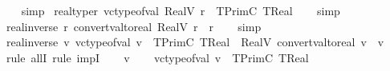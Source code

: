 \begin{isabellebody}
%
\isadelimproof
\ \ %
\endisadelimproof
%
\isatagproof
{}\isamarkupfalse%
\ simp%
\endisatagproof
{\isafoldproof}%
%
\isadelimproof
\isanewline
%
\endisadelimproof
\isanewline
{}\isamarkupfalse%
\ real{\isacharunderscore}{\kern0pt}type{\isacharcolon}{\kern0pt}{\isachardoublequoteopen}{\isasymforall}r{\isachardot}{\kern0pt}\ vc{\isacharunderscore}{\kern0pt}type{\isacharunderscore}{\kern0pt}of{\isacharunderscore}{\kern0pt}val\ {\isacharparenleft}{\kern0pt}RealV\ r{\isacharparenright}{\kern0pt}\ {\isacharequal}{\kern0pt}\ TPrimC\ TReal{\isachardoublequoteclose}\isanewline
%
\isadelimproof
\ \ %
\endisadelimproof
%
\isatagproof
{}\isamarkupfalse%
\ simp%
\endisatagproof
{\isafoldproof}%
%
\isadelimproof
\isanewline
%
\endisadelimproof
\isanewline
{}\isamarkupfalse%
\ real{\isacharunderscore}{\kern0pt}inverse{\isacharunderscore}{\kern0pt}{}{\isacharcolon}{\kern0pt}{\isachardoublequoteopen}{\isasymforall}\ r{\isachardot}{\kern0pt}\ convert{\isacharunderscore}{\kern0pt}val{\isacharunderscore}{\kern0pt}to{\isacharunderscore}{\kern0pt}real\ {\isacharparenleft}{\kern0pt}RealV\ r{\isacharparenright}{\kern0pt}\ {\isacharequal}{\kern0pt}\ r{\isachardoublequoteclose}\isanewline
%
\isadelimproof
\ \ %
\endisadelimproof
%
\isatagproof
{}\isamarkupfalse%
\ simp%
\endisatagproof
{\isafoldproof}%
%
\isadelimproof
\isanewline
%
\endisadelimproof
\isanewline
{}\isamarkupfalse%
\ real{\isacharunderscore}{\kern0pt}inverse{\isacharunderscore}{\kern0pt}{}{\isacharcolon}{\kern0pt}{\isachardoublequoteopen}{\isasymforall}\ v{\isachardot}{\kern0pt}\ vc{\isacharunderscore}{\kern0pt}type{\isacharunderscore}{\kern0pt}of{\isacharunderscore}{\kern0pt}val\ v\ {\isacharequal}{\kern0pt}\ TPrimC\ TReal\ {\isasymlongrightarrow}\ RealV\ {\isacharparenleft}{\kern0pt}convert{\isacharunderscore}{\kern0pt}val{\isacharunderscore}{\kern0pt}to{\isacharunderscore}{\kern0pt}real\ v{\isacharparenright}{\kern0pt}\ {\isacharequal}{\kern0pt}\ v{\isachardoublequoteclose}\isanewline
%
\isadelimproof
%
\endisadelimproof
%
\isatagproof
{}\isamarkupfalse%
\ {\isacharparenleft}{\kern0pt}rule\ allI{\isacharcomma}{\kern0pt}\ rule\ impI{\isacharparenright}{\kern0pt}\isanewline
\ \ \isamarkupfalse%
\ v\isanewline
\ \ \isamarkupfalse%
\ {\isachardoublequoteopen}vc{\isacharunderscore}{\kern0pt}type{\isacharunderscore}{\kern0pt}of{\isacharunderscore}{\kern0pt}val\ v\ {\isacharequal}{\kern0pt}\ TPrimC\ TReal{\isachardoublequoteclose}\isanewline

\end{isabellebody}
